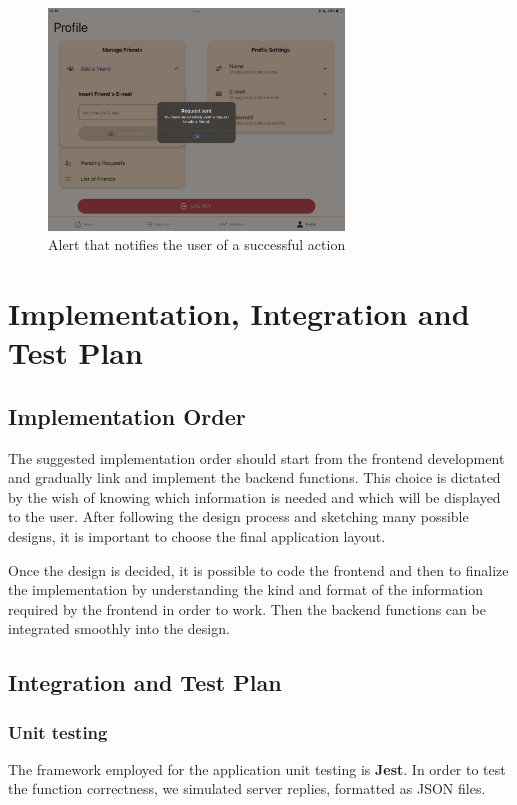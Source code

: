 \documentclass[12pt]{article}
\begin{document}
\begin{figure}[h!]
    \begin{center}
        \includegraphics[width=0.7\textwidth, clip]{../../assets/tablet/alert.PNG}
    \end{center}
    \caption{Alert that notifies the user of a successful action}
    \label{fig:talert}
\end{figure}

\clearpage
\section{Implementation, Integration and Test Plan}\label{sec:test}
\subsection{Implementation Order}
The suggested implementation order should start from the frontend development and gradually link and implement the backend functions. This choice is dictated by the wish of knowing which information is needed and which will be displayed to the user. After following the design process and sketching many possible designs, it is important to choose the final application layout.

Once the design is decided, it is possible to code the frontend and then to finalize the implementation by understanding the kind and format of the information required by the frontend in order to work. Then the backend functions can be integrated smoothly into the design.

\subsection{Integration and Test Plan}
\subsubsection{Unit testing}
The framework employed for the application unit testing is \textbf{Jest}. In order to test the function correctness, we simulated server replies, formatted as JSON files.
\end{document}
